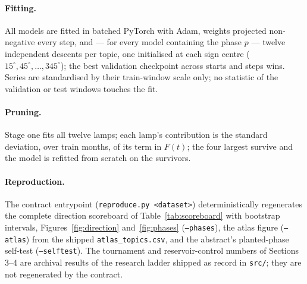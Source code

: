 \documentclass[11pt]{artaquest}
\begin{document}
\paragraph{Fitting.} All models are fitted in batched PyTorch with Adam, weights projected
non-negative every step, and --- for every model containing the phase $p$ --- twelve independent
descents per topic, one initialised at each sign centre ($15^{\circ}, 45^{\circ}, \ldots,
345^{\circ}$); the best validation checkpoint across starts and steps wins. Series are
standardised by their train-window scale only; no statistic of the validation or test windows
touches the fit.

\paragraph{Pruning.} Stage one fits all twelve lamps; each lamp's contribution is the standard
deviation, over train months, of its term in $F(t)$; the four largest survive and the model is
refitted from scratch on the survivors.

\paragraph{Reproduction.} The contract entrypoint (\texttt{reproduce.py <dataset>})
deterministically regenerates the complete direction scoreboard of
Table~\ref{tab:scoreboard} with bootstrap intervals, Figures~\ref{fig:direction}
and~\ref{fig:phases} (\texttt{--phases}), the atlas figure (\texttt{--atlas}) from the shipped
\texttt{atlas\_topics.csv}, and the abstract's planted-phase self-test (\texttt{--selftest}).
The tournament and reservoir-control numbers of Sections 3--4 are archival results of the
research ladder shipped as record in \texttt{src/}; they are not regenerated by the contract.

\declarations



\end{document}
